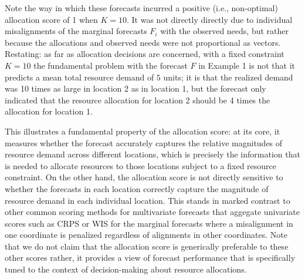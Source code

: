 \documentclass{article}
\begin{document}
Note the way in which these forecasts incurred a positive (i.e., non-optimal) allocation score of 1 when $K = 10$. It was not directly directly due to individual misalignments of the marginal forecasts $F_i$ with the observed needs, but rather because the allocations and observed needs were not proportional as vectors.
Restating: as far as allocation decisions are concerned, with a fixed constraint $K=10$ the fundamental problem with the forecast $F$ in Example 1 is not that it predicts a mean total resource demand of $5$ units; it is that the realized demand was 10 times as large in location 2 as in location 1, but the forecast only indicated that the resource allocation for location 2 should be 4 times the allocation for location 1.

This illustrates a fundamental property of the allocation score: at its core, it measures whether the forecast accurately captures the relative magnitudes of resource demand across different locations, which is precisely the information that is needed to allocate resources to those locations subject to a fixed resource constraint.
On the other hand, the allocation score is not directly sensitive to whether the forecasts in each location correctly capture the magnitude of resource demand in each individual location.
This stands in marked contrast to other common scoring methods for multivariate forecasts that aggegate univariate scores such as CRPS or WIS for the marginal forecasts where a 
misalignment in one coordinate is penalized regardless of alignments in other coordinates. Note that we do not claim that the allocation score is generically preferable to these other scores \textemdash rather, it provides a view of forecast performance that is specifically tuned to the context of decision-making about resource allocations.


\end{document}
